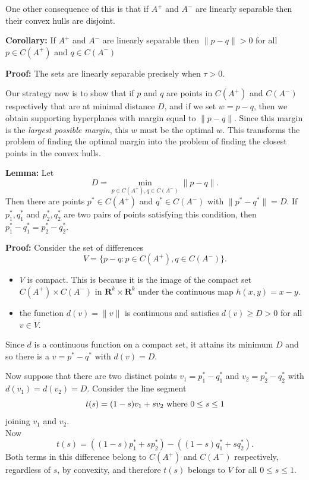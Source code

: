 \documentclass[
  11pt,
  letterpaper,
]{scrbook}
\theoremstyle{plain}
\theoremstyle{remark}
\begin{document}
One other consequence of this is that if \(A^{+}\) and \(A^{-}\) are
linearly separable then their convex hulls are disjoint.

\textbf{Corollary:} If \(A^{+}\) and \(A^{-}\) are linearly separable
then \(\|p-q\|>0\) for all \(p\in C(A^{+})\) and \(q\in C(A^{-})\)

\textbf{Proof:} The sets are linearly separable precisely when
\(\tau>0\).

Our strategy now is to show that if \(p\) and \(q\) are points in
\(C(A^{+})\) and \(C(A^{-})\) respectively that are at minimal distance
\(D\), and if we set \(w=p-q\), then we obtain supporting hyperplanes
with margin equal to \(\|p-q\|\). Since this margin is the \emph{largest
possible margin}, this \(w\) must be the optimal \(w\). This transforms
the problem of finding the optimal margin into the problem of finding
the closest points in the convex hulls.

\textbf{Lemma:} Let \[
D=\min_{p\in C(A^{+}),q\in C(A^{-})} \|p-q\|.
\] Then there are points \(p^*\in C(A^{+})\) and \(q^{*}\in C(A^{-})\)
with \(\|p^{*}-q^{*}\|=D\). If \(p_1^{*},q_1^{*}\) and
\(p_2^{*},q_2^{*}\) are two pairs of points satisfying this condition,
then \(p_1^{*}-q_1^{*}=p_2^{*}-q_{2}^{*}\).

\textbf{Proof:} Consider the set of differences \[
V = \{p-q: p\in C(A^{+}),q\in C(A^{-})\}.
\]

\begin{itemize}
\item
  \(V\) is compact. This is because it is the image of the compact set
  \(C(A^{+})\times C(A^{-})\) in \(\mathbf{R}^{k}\times\mathbf{R}^{k}\)
  under the continuous map \(h(x,y)=x-y\).
\item
  the function \(d(v)=\|v\|\) is continuous and satisfies
  \(d(v)\ge D>0\) for all \(v\in V\).
\end{itemize}

Since \(d\) is a continuous function on a compact set, it attains its
minimum \(D\) and so there is a \(v=p^{*}-q^{*}\) with \(d(v)=D\).

Now suppose that there are two distinct points \(v_1=p_1^*-q_1^*\) and
\(v_2=p_2^*-q_2^*\) with \(d(v_1)=d(v_2)=D\). Consider the line segment
\[
t(s) = (1-s)v_1+sv_2\hbox{ where }0\le s\le 1
\] joining \(v_1\) and \(v_2\).\\
Now \[
t(s) = ((1-s)p_1^*+sp_2^*)-((1-s)q_1^*+sq_2^*).
\] Both terms in this difference belong to \(C(A^{+})\) and \(C(A^{-})\)
respectively, regardless of \(s\), by convexity, and therefore \(t(s)\)
belongs to \(V\) for all \(0\le s\le 1\).
\end{document}
